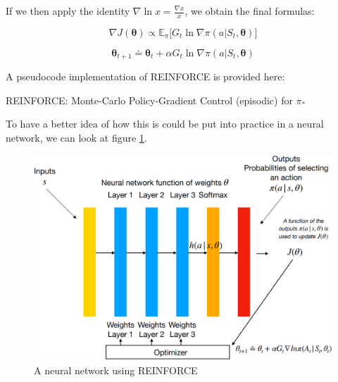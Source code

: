 If we then apply the identity $\nabla \ln{x} = \frac{\nabla x}{x}$, we obtain the final formulas:

\begin{equation}
    \nabla J(\boldsymbol{\theta}) \propto \mathbb{E}_\pi \Big[ G_t \ln{\nabla \pi (a \vert S_t, \boldsymbol{\theta})} \Big]
    \label{eq:ch8-finalreinforcepolicygradient}
\end{equation}

\begin{equation}
    \boldsymbol{\theta}_{t+1} \doteq \boldsymbol{\theta}_{t} + \alpha G_t \ln{\nabla \pi (a \vert S_t, \boldsymbol{\theta})}
    \label{eq:ch8-finalreinforceupdaterule}
\end{equation}

A pseudocode implementation of REINFORCE is provided here:

\begin{algorithm}[H]
\DontPrintSemicolon
\SetAlgoVlined
{}

\caption{REINFORCE: Monte-Carlo Policy-Gradient Control (episodic) for $\pi_*$}
\end{algorithm}

To have a better idea of how this is could be put into practice in a neural network, we can look at figure \ref{fig:ch8-reinforcepolicynetwork}.

\begin{figure}[hbp]
    \centering
    \includegraphics[scale=0.35]{Images/Chapter 8/reinforce-policy-network.png}
    \caption{A neural network using REINFORCE}
    \label{fig:ch8-reinforcepolicynetwork}
\end{figure}

